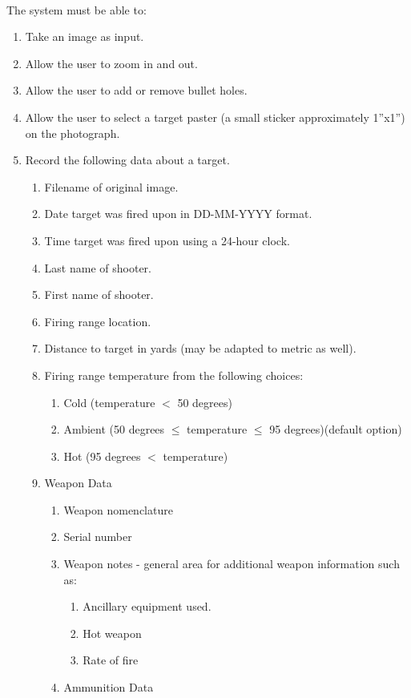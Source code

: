\paragraph{}The system must be able to:
\begin{enumerate}
	\item Take an image as input.
	\item Allow the user to zoom in and out.
	\item Allow the user to add or remove bullet holes.
	\item Allow the user to select a target paster (a small sticker approximately 1''x1'') on the photograph.
	\item Record the following data about a target.
	\begin{enumerate}
		\item Filename of original image.
		\item Date target was fired upon in DD-MM-YYYY format.
		\item Time target was fired upon using a 24-hour clock.
		\item Last name of shooter.
		\item First name of shooter.
		\item Firing range location.
		\item Distance to target in yards (may be adapted to metric as well).
		\item Firing range temperature from the following choices:
		\begin{enumerate}
			\item Cold (temperature $<$ 50 degrees)
			\item Ambient (50 degrees $\le$ temperature $\le$ 95 degrees)(default option)
			\item Hot (95 degrees $<$ temperature)
		\end{enumerate}
		\item Weapon Data
		\begin{enumerate}
			\item Weapon nomenclature
			\item Serial number
			\item Weapon notes - general area for additional weapon information such as:
			\begin{enumerate}
				\item Ancillary equipment used.
				\item Hot weapon
				\item Rate of fire
			\end{enumerate}
			\item Ammunition Data

\end{enumerate}
\end{enumerate}
\end{enumerate}
